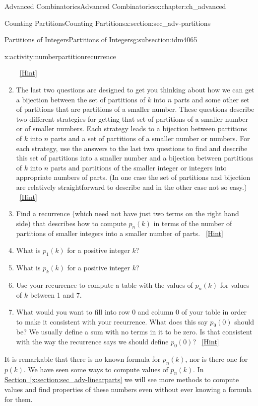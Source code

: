 \documentclass[oneside,10pt,]{book}
\numberwithin{equation}{chapter}
\begin{document}
\begin{chapterptx}{Advanced Combinatorics}{}{Advanced Combinatorics}{}{}{x:chapter:ch_advanced}
\begin{sectionptx}{Counting Partitions}{}{Counting Partitions}{}{}{x:section:sec_adv-partitions}
\begin{subsectionptx}{Partitions of Integers}{}{Partitions of Integers}{}{}{g:subsection:idm4065}
\begin{activity}{}{x:activity:numberpartitionrecurrence}
\begin{enumerate}[font=\bfseries,label=(\alph*),ref=\alph*]
\qquad~\hfill{\tiny\hyperlink{g:hint:idm4287-back}{[Hint]}}\item{}The last two questions are designed to get you thinking about how we can get a bijection between the set of partitions of \(k\) into \(n\) parts and some other set of partitions that are partitions of a smaller number.  These questions describe two different strategies for getting that set of partitions of a smaller number or of smaller numbers.  Each strategy leads to a bijection between partitions of \(k\) into \(n\) parts and a set of partitions of a smaller number or numbers.  For each strategy, use the answers to the last two questions to find and describe this set of partitions into a smaller number and a bijection between partitions of \(k\) into \(n\) parts and partitions of the smaller integer or integers into appropriate numbers of parts. (In one case the set of partitions and bijection are relatively straightforward to describe and in the other case not so easy.)%
\qquad~\hfill{\tiny\hyperlink{g:hint:idm4304-back}{[Hint]}}\item{}Find a recurrence (which need not have just two terms on the right hand side) that describes how to compute \(p_n(k)\) in terms of the number of partitions of smaller integers into a smaller number of parts.%
\qquad~\hfill{\tiny\hyperlink{g:hint:idm4336-back}{[Hint]}}\item{}What is \(p_1(k)\) for a positive integer \(k\)?%
\item{}What is \(p_k(k)\) for a positive integer \(k\)?%
\item{}Use your recurrence to compute a table with the values of \(p_n(k)\) for values of \(k\) between 1 and 7.%
\item{}What would you want to fill into row 0 and column 0 of your table in order to make it consistent with your recurrence.  What does this say \(p_0(0)\) should be?  We usually define a sum with no terms in it to be zero. Is that consistent with the way the recurrence says we should define \(p_0(0)\)?%
\qquad~\hfill{\tiny\hyperlink{g:hint:idm4450-back}{[Hint]}}\end{enumerate}
\end{activity}
It is remarkable that there is no known formula for \(p_n(k)\), nor is there one for \(p(k)\). We have seen some ways to compute values of \(p_n(k)\).  In \hyperref[x:section:sec_adv-linearparts]{Section~\ref{x:section:sec_adv-linearparts}} we will see more methods to compute values and find properties of these numbers even without ever knowing a formula for them.%

\end{subsectionptx}
\end{sectionptx}
\end{chapterptx}
\end{document}
